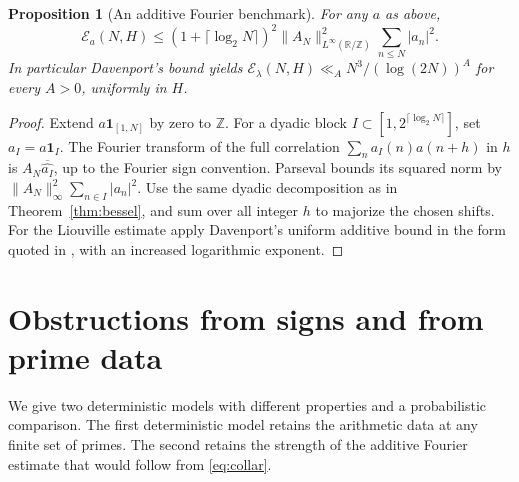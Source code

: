 \documentclass[11pt]{amsart}
\newtheorem{proposition}[theorem]{Proposition}
\theoremstyle{definition}
\theoremstyle{remark}
\newcommand{\E}{\mathcal E}
\newcommand{\one}{\mathbf 1}
\numberwithin{equation}{section}
\begin{document}
\begin{proposition}[An additive Fourier benchmark]\label{prop:davenport}
For any \(a\) as above,
\[
 \E_a(N,H)\le (1+\lceil\log_2 N\rceil)^2
 \|A_N\|_{L^\infty(\mathbb R/\mathbb Z)}^2\sum_{n\le N}|a_n|^2.
\]
In particular Davenport's bound yields \(\E_\lambda(N,H)\ll_A N^3/(\log(2N))^A\) for every \(A>0\), uniformly in \(H\).
\end{proposition}
\begin{proof}
Extend \(a\one_{[1,N]}\) by zero to \(\mathbb Z\). For a dyadic block \(I\subset[1,2^{\lceil\log_2 N\rceil}]\), set \(a_I=a\one_I\). The Fourier transform of the full correlation \(\sum_n a_I(n)a(n+h)\) in \(h\) is \(A_N\overline{\widehat{a_I}}\), up to the Fourier sign convention. Parseval bounds its squared norm by \(\|A_N\|_\infty^2\sum_{n\in I}|a_n|^2\). Use the same dyadic decomposition as in Theorem~\ref{thm:bessel}, and sum over all integer \(h\) to majorize the chosen shifts. For the Liouville estimate apply Davenport's uniform additive bound in the form quoted in \cite{mrt}, with an increased logarithmic exponent.
\end{proof}

\section{Obstructions from signs and from prime data}\label{sec:obstructions}

We give two deterministic models with different properties and a probabilistic comparison. The first deterministic model retains the arithmetic data at any finite set of primes. The second retains the strength of the additive Fourier estimate that would follow from \eqref{eq:collar}.
\end{document}
